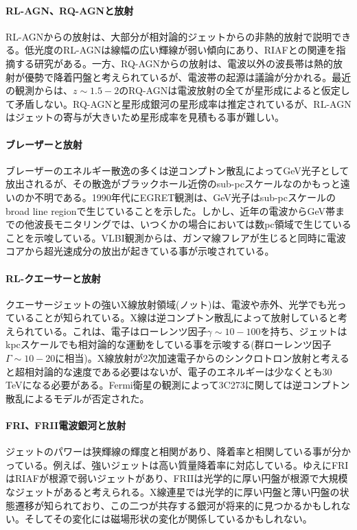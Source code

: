 \paragraph{RL-AGN、RQ-AGNと放射}

RL-AGNからの放射は、大部分が相対論的ジェットからの非熱的放射で説明できる。低光度のRL-AGNは線幅の広い輝線が弱い傾向にあり、RIAFとの関連を指摘する研究がある。一方、RQ-AGNからの放射は、電波以外の波長帯は熱的放射が優勢で降着円盤と考えられているが、電波帯の起源は議論が分かれる。最近の観測からは、$z\sim 1.5-2$のRQ-AGNは電波放射の全てが星形成によると仮定して矛盾しない。RQ-AGNと星形成銀河の星形成率は推定されているが、RL-AGNはジェットの寄与が大きいため星形成率を見積もる事が難しい。

\paragraph{ブレーザーと放射}

ブレーザーのエネルギー散逸の多くは逆コンプトン散乱によってGeV光子として放出されるが、その散逸がブラックホール近傍のsub-pcスケールなのかもっと遠いのか不明である。1990年代にEGRET観測は、GeV光子はsub-pcスケールのbroad line regionで生じていることを示した。しかし、近年の電波からGeV帯までの他波長モニタリングでは、いつくかの場合においては数pc領域で生じていることを示唆している。VLBI観測からは、ガンマ線フレアが生じると同時に電波コアから超光速成分の放出が起きている事が示唆されている。

\paragraph{RL-クエーサーと放射}

クエーサージェットの強いX線放射領域(ノット)は、電波や赤外、光学でも光っていることが知られている。X線は逆コンプトン散乱によって放射していると考えられている。これは、電子はローレンツ因子$\gamma \sim 10-100$を持ち、ジェットはkpcスケールでも相対論的な運動をしている事を示唆する(群ローレンツ因子$\Gamma \sim 10-20$に相当)。X線放射が2次加速電子からのシンクロトロン放射と考えると超相対論的な速度である必要はないが、電子のエネルギーは少なくとも30 TeVになる必要がある。Fermi衛星の観測によって3C273に関しては逆コンプトン散乱によるモデルが否定された。

\paragraph{FRI、FRII電波銀河と放射}

ジェットのパワーは狭輝線の輝度と相関があり\citep{1991Natur.349..138R}、降着率と相関している事が分かっている。例えば、強いジェットは高い質量降着率に対応している。ゆえにFRIはRIAFが根源で弱いジェットがあり、FRIIは光学的に厚い円盤が根源で大規模なジェットがあると考えられる。X線連星では光学的に厚い円盤と薄い円盤の状態遷移が知られており、この二つが共存する銀河が将来的に見つかるかもしれない。そしてその変化には磁場形状の変化が関係しているかもしれない。


